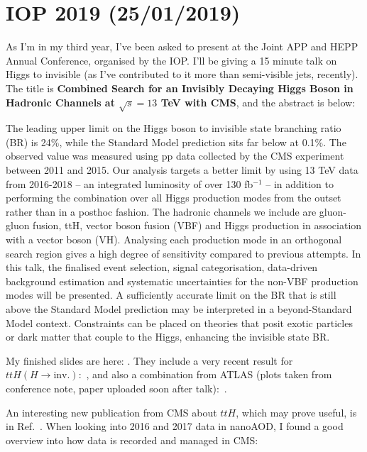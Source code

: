 \section{IOP 2019 (25/01/2019)}

As I'm in my third year, I've been asked to present at the Joint APP and HEPP Annual Conference, organised by the IOP. I'll be giving a 15 minute talk on Higgs to invisible (as I've contributed to it more than semi-visible jets, recently). The title is \textbf{Combined Search for an Invisibly Decaying Higgs Boson in Hadronic Channels at $\sqrt{s} = 13$ TeV with CMS}, and the abstract is below:

The leading upper limit on the Higgs boson to invisible state branching ratio (BR) is 24\%, while the Standard Model prediction sits far below at 0.1\%. The observed value was measured using pp data collected by the CMS experiment between 2011 and 2015. Our analysis targets a better limit by using 13 TeV data from 2016-2018 -- an integrated luminosity of over 130 fb$^{-1}$ -- in addition to performing the combination over all Higgs production modes from the outset rather than in a posthoc fashion. The hadronic channels we include are gluon-gluon fusion, ttH, vector boson fusion (VBF) and Higgs production in association with a vector boson (VH). Analysing each production mode in an orthogonal search region gives a high degree of sensitivity compared to previous attempts. In this talk, the finalised event selection, signal categorisation, data-driven background estimation and systematic uncertainties for the non-VBF production modes will be presented. A sufficiently accurate limit on the BR that is still above the Standard Model prediction may be interpreted in a beyond-Standard Model context. Constraints can be placed on theories that posit exotic particles or dark matter that couple to the Higgs, enhancing the invisible state BR.

My finished slides are here: %
. They include a very recent result for $ttH (H \rightarrow \mathrm{inv.})$:~\cite{CMS-PAS-HIG-18-008}, and also a combination from ATLAS (plots taken from conference note, paper uploaded soon after talk):~\cite{Aaboud:2019rtt}.


An interesting new publication from CMS about $ttH$, which may prove useful, is in Ref.~\cite{PhysRevLett.120.231801}.
When looking into 2016 and 2017 data in nanoAOD, I found a good overview into how data is recorded and managed in CMS: %
